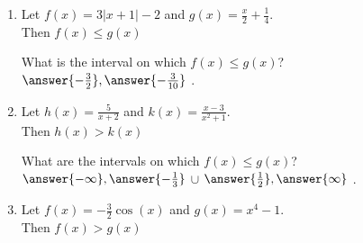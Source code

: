 \documentclass{ximera}
\author{Elizabeth Campolongo}
\begin{document}
%
\begin{enumerate}

\item \begin{exercise}
Let $f(x) = 3|x+1|-2$ and $g(x) = \frac{x}{2} + \frac{1}{4}$. \\
Then $f(x) \leq g(x)$ 
\begin{multipleChoice}
\end{multipleChoice}
\begin{exercise}
What is the interval on which $f(x) \leq g(x)$?\\
\wordChoice{\choice{(}\choice[correct]{[}}$\answer{-\frac{3}{2}} , \answer{-\frac{3}{10}}$ 
\wordChoice{\choice{)}\choice[correct]{]}}.
\end{exercise}
\end{exercise}
\item \begin{exercise}
Let $h(x) = \frac{5}{x+2}$ and $k(x) = \frac{x-3}{x^2+1}$.\\
Then $h(x) > k(x)$ 
\begin{multipleChoice}
\end{multipleChoice}
\begin{exercise}
What are the intervals on which $f(x) \leq g(x)$?\\
\wordChoice{\choice[correct]{(}\choice{[}} $\answer{-\infty} , \answer{-\frac{1}{3}}$ 
\wordChoice{\choice[correct]{)}\choice{]}}
$\cup$
\wordChoice{\choice[correct]{(}\choice{[}} $\answer{\frac{1}{2}} , \answer{\infty}$ 
\wordChoice{\choice[correct]{)}\choice{]}}.
\end{exercise}
\end{exercise}
\item \begin{exercise}
Let $f(x) = -\frac{3}{2}\cos(x)$ and $g(x) = x^4-1$. \\
Then $f(x) > g(x)$ 
\begin{multipleChoice}

\end{multipleChoice}
\end{exercise}
\end{enumerate}
\end{document}
